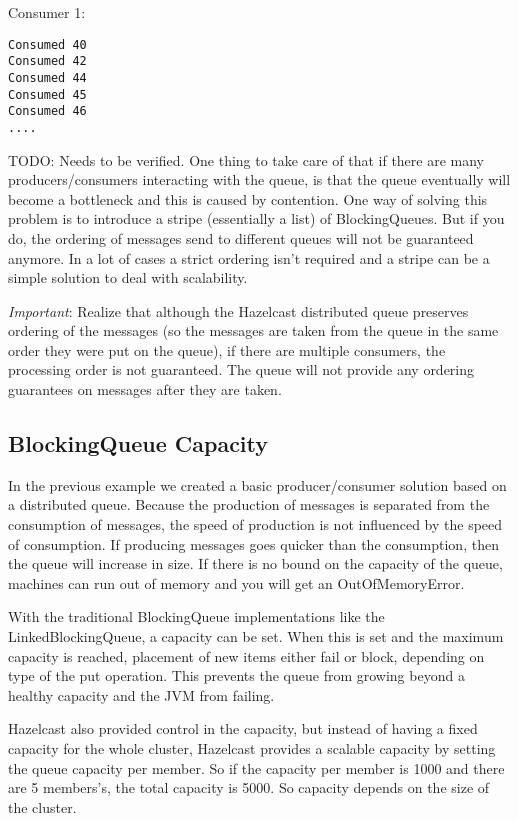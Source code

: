 Consumer 1:
\begin{lstlisting}
Consumed 40  
Consumed 42 
Consumed 44 
Consumed 45
Consumed 46
....
\end{lstlisting}

TODO: Needs to be verified.
One thing to take care of that if there are many producers/consumers interacting with the queue, is that the queue eventually will become a bottleneck and this is caused by contention. One way of solving this problem is to introduce a stripe (essentially a list) of BlockingQueues. But if you do, the ordering of messages send to different queues will not be guaranteed anymore. In a lot of cases a strict ordering isn't required and a stripe can be a simple solution to deal with scalability.

\emph{Important}: Realize that although the Hazelcast distributed queue preserves ordering of the messages (so the messages are taken from the queue in the same order they were put on the queue), if there are multiple consumers, the processing order is not guaranteed. The queue will not provide any ordering guarantees on messages after they are taken.

\subsection{BlockingQueue Capacity}
In the previous example we created a basic producer/consumer solution based on a distributed queue. Because the production of messages is separated from the consumption of messages, the speed of production is not influenced by the speed of consumption. If producing messages goes quicker than the consumption, then the queue will increase in size. If there is no bound on the capacity of the queue, machines can run out of memory and you will get an OutOfMemoryError. 

With the traditional BlockingQueue implementations like the LinkedBlockingQueue, a capacity can be set. When this is set and the maximum capacity is reached, placement of new items either fail or block, depending on type of the put operation. This prevents the queue from growing beyond a healthy capacity and the JVM from failing.

Hazelcast also provided control in the capacity, but instead of having a fixed capacity for the whole cluster, Hazelcast provides a scalable capacity by setting the queue capacity per member. So if the capacity per member is 1000 and there are 5 members's, the total capacity is 5000. So capacity depends on the size of the cluster.

